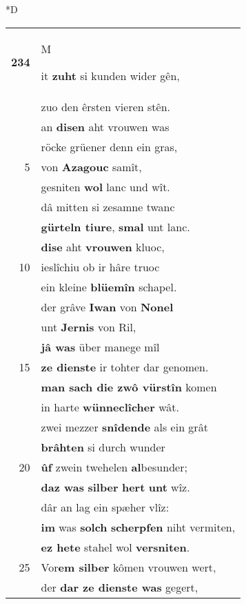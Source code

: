 \documentclass[8pt,a4paper,notitlepage]{article}
\begin{document}
\begin{table}[ht]
\begin{minipage}[t]{0.5\linewidth}
\small
\begin{center}*D
\end{center}
\begin{tabular}{rl}
\textbf{234} & \begin{large}M\end{large}it \textbf{zuht} si kunden wider gên,\\ 
 & zuo den êrsten vieren stên.\\ 
 & an \textbf{disen} aht vrouwen was\\ 
 & röcke grüener denn ein gras,\\ 
5 & von \textbf{Azagouc} samît,\\ 
 & gesniten \textbf{wol} lanc und wît.\\ 
 & dâ mitten si zesamne twanc\\ 
 & \textbf{gürteln tiure}, \textbf{smal} unt lanc.\\ 
 & \textbf{dise} aht \textbf{vrouwen} kluoc,\\ 
10 & ieslîchiu ob ir hâre truoc\\ 
 & ein kleine \textbf{blüemîn} schapel.\\ 
 & der grâve \textbf{Iwan} von \textbf{Nonel}\\ 
 & unt \textbf{Jernis} von Ril,\\ 
 & \textbf{jâ was} über manege mîl\\ 
15 & \textbf{ze dienste} ir tohter dar genomen.\\ 
 & \textbf{man sach die zwô vürstîn} komen\\ 
 & in harte \textbf{wünneclîcher} wât.\\ 
 & zwei mezzer \textbf{snîdende} als ein grât\\ 
 & \textbf{brâhten} si durch wunder\\ 
20 & \textbf{ûf} zwein twehelen \textbf{al}besunder;\\ 
 & \textbf{daz was} \textbf{silber} \textbf{hert} \textbf{unt} wîz.\\ 
 & dâr an lag ein spæher vlîz:\\ 
 & \textbf{im} was \textbf{solch} \textbf{scherpfen} niht vermiten,\\ 
 & \textbf{ez hete} stahel wol \textbf{versniten}.\\ 
25 & Vor\textbf{em silber} kômen vrouwen wert,\\ 
 & der \textbf{dar ze dienste was} gegert,\\ 

\end{tabular}
\end{minipage}
\end{table}
\end{document}
